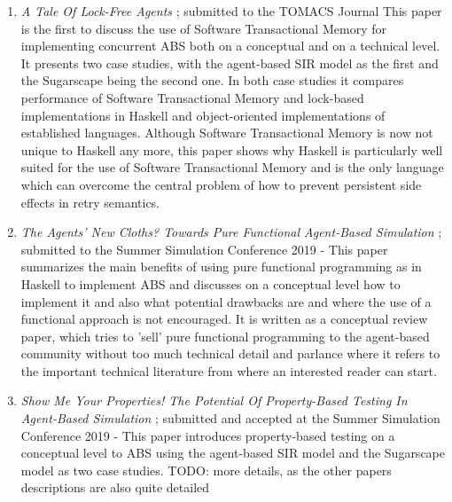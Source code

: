 \begin{enumerate}
	\item \textit{A Tale Of Lock-Free Agents} \cite{thaler_tale_2018}; submitted to the TOMACS Journal %
This paper is the first to discuss the use of Software Transactional Memory for implementing concurrent ABS both on a conceptual and on a technical level. It presents two case studies, with the agent-based SIR model as the first and the Sugarscape being the second one. In both case studies it compares performance of Software Transactional Memory and lock-based implementations in Haskell and object-oriented implementations of established languages. Although Software Transactional Memory is now not unique to Haskell any more, this paper shows why Haskell is particularly well suited for the use of Software Transactional Memory and is the only language which can overcome the central problem of how to prevent persistent side effects in retry semantics. %

	\item \textit{The Agents' New Cloths? Towards Pure Functional Agent-Based Simulation} \cite{thaler_agents_2019}; submitted %
to the Summer Simulation Conference 2019 - This paper summarizes the main benefits of using pure functional programming as in Haskell to implement ABS and discusses on a conceptual level how to implement it and also what potential drawbacks are and where the use of a functional approach is not encouraged. It is written as a conceptual review paper, which tries to 'sell' pure functional programming to the agent-based community without too much technical detail and parlance where it refers to the important technical literature from where an interested reader can start. %
	
	\item \textit{Show Me Your Properties! The Potential Of Property-Based Testing In Agent-Based Simulation} \cite{thaler_show_2019}; submitted and accepted at the Summer Simulation Conference 2019 - This paper introduces property-based testing on a conceptual level to ABS using the agent-based SIR model and the Sugarscape model as two case studies. TODO: more details, as the other papers descriptions are also quite detailed %
	

\end{enumerate}
